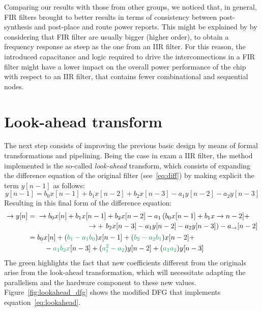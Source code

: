 \documentclass[a4paper]{article}
\begin{document}
Comparing our results with those from other groups, we noticed that, in general, FIR filters brought to better results in terms of consistency between post-synthesis and post-place and route power reports. This might be explained by by considering that FIR filter are usually bigger (higher order), to obtain a frequency response as steep as the one from an IIR filter. For this reason, the introduced capacitance and logic required to drive the interconnections in a FIR filter might have a lower impact on the overall power performance of the chip with respect to an IIR filter, that contains fewer combinational and sequential nodes. 

\section{Look-ahead transform}\label{sec:improv}
The next step consists of improving the previous basic design by means of formal transformations and pipelining. Being the case in exam a IIR filter, the method implemented is the so-called \emph{look-ahead} transform, which consists of expanding the difference equation of the original filter (see~\ref{eq:diff}) by making explicit the term $y[n-1]$ as follows:
\begin{equation*}
    y[n-1] = b_0x[n-1] + b_1x[n-2] + b_2x[n-3] - a_1y[n-2] - a_2y[n-3]
\end{equation*}
Resulting in this final form of the difference equation:
\begin{equation}\label{eq:lookahead}
\begin{split}
    \rightarrow y[n] &= \!\begin{multlined}[t]
    \rightarrow   b_0x[n] + b_1x[n-1] + b_2x[n-2] - a_1\left(b_0x[n-1]+ b_1x\rightarrow n-2]+\right. \\
        \left.\rightarrow +\ b_2x[n-3] - a_1y[n-2] - a_2y[n-3]\right) - a_\rightarrow  [n-2]
    \end{multlined} \\
    &= \!\begin{multlined}[t]
        b_0x[n] + (\textcolor{ForestGreen}{b_1-a_1b_0})x[n-1] + (\textcolor{ForestGreen}{b_2-a_2b_1})x[n-2] + \\
        -\textcolor{ForestGreen}{a_1b_2x}[n-3] + (\textcolor{ForestGreen}{a_1^2-a_2})y[n-2] + (\textcolor{ForestGreen}{a_1a_2})y[n-3]
    \end{multlined} \\   
\end{split}
\end{equation}
The green highlights the fact that new coefficients different from the originals arise from the look-ahead transformation, which will necessitate adapting the parallelism and the hardware component to these new values.
Figure~\ref{fig:lookahead_dfg} shows the modified DFG that implements equation~\ref{eq:lookahead}.
\end{document}
